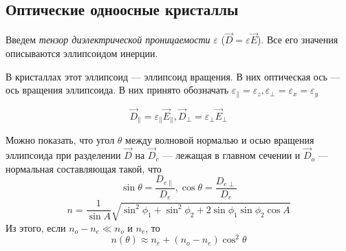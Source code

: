 \documentclass[a4paper, 12pt]{article}
\begin{document}
\subsection*{Оптические одноосные кристаллы}
Введем \textit{тензор диэлектрической проницаемости} $\varepsilon$ ($\vec{D} = \varepsilon \vec{E}$). Все его значения описываются эллипсоидом инерции. 

В кристаллах этот эллипсоид --- эллипсоид вращения. В них оптическая ось --- ось вращения эллипсоида. В них принято обозначать $\varepsilon_{\parallel} = \varepsilon_z, \varepsilon_{\perp} = \varepsilon_x = \varepsilon_y$

\begin{equation}
\vec{D}_{\parallel} = \varepsilon_{\parallel} \vec{E}_{\parallel},\vec{D}_{\perp} = \varepsilon_{\perp} \vec{E}_{\perp} 
\end{equation}

Можно показать, что угол $\theta$ между волновой нормалью и осью вращения эллипсоида при разделении $\vec{D}$ на $\vec{D}_e$ --- лежащая в главном сечении и $\vec{D}_o$ --- нормальная составляющая такой, что
\begin{equation}
\sin \theta = \dfrac{D_{e\parallel}}{D_e}, \cos \theta = \dfrac{D_{e\perp}}{D_e}
\end{equation}
\begin{equation}
n = \dfrac{1}{\sin A}\sqrt{\sin^2 \phi_1 + \sin^2 \phi_2 + 2 \sin \phi_1 \sin \phi_2 \cos A}
\end{equation}
Из этого, если $n_o - n_e \ll n_o$ и $n_e$, то 
\begin{equation}
n(\theta) \approx n_e + (n_o - n_e) \cos^2 \theta
\end{equation}
\end{document}
